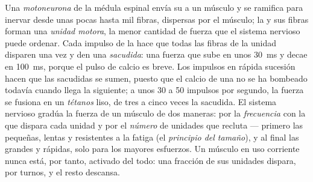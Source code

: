 \begin{definition}\label{def:b2:muscle-movement:motorunit}
Una \emph{motoneurona} de la médula espinal envía su  a un músculo y
se ramifica para inervar desde unas pocas hasta mil fibras, dispersas por
el músculo; la  y sus fibras forman una \emph{unidad motora}, la
menor cantidad de fuerza que el sistema nervioso puede ordenar. Cada
impulso de la  hace que todas las fibras de la unidad disparen una
vez y den una \emph{sacudida}: una fuerza que sube en unos \qty{30}{ms} y
decae en \qty{100}{ms}, porque el pulso de calcio es breve. Los impulsos
en rápida sucesión hacen que las sacudidas se sumen, puesto que el calcio
de una no se ha bombeado todavía cuando llega la siguiente; a unos 30
a 50 impulsos por segundo, la fuerza se fusiona en un \emph{tétanos} liso,
de tres a cinco veces la sacudida. El sistema nervioso gradúa la fuerza de
un músculo de dos maneras: por la \emph{frecuencia} con la que dispara cada
unidad y por el \emph{número} de unidades que recluta --- primero las
pequeñas, lentas y resistentes a la fatiga (el \emph{principio del
tamaño}), y al final las grandes y rápidas, solo para los mayores
esfuerzos. Un músculo en uso corriente nunca está, por tanto, activado del
todo: una fracción de sus unidades dispara, por turnos, y el resto
descansa.
\end{definition}

